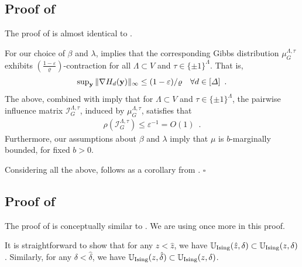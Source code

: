 \documentclass[11pt,reqno]{amsart}
\numberwithin{equation}{section}
\newcommand{\cI}{{\mathcal{I}}}
\newcommand{\cadmiumgreen}[1]{{\color{cadmiumgreen}#1}}
\newcommand{\goldenbrown}[1]{{\color{goldenbrown}#1}}
\newcommand{\maxDeg}{{\Delta}}
\newcommand{\UnIsing}{{\mathbb{U}_{\rm Ising}}}
\newcommand{\logtrecur}{H}
\newcommand{\infmatrix}{\cI}
\newcommand{\spradius}{{\rho}}
\newcommand{\norm}[2]{\goldenbrown{\|} #1 \goldenbrown{\|}_{#2}}
\newcommand{\aspradius}{{\varrho}}
\renewcommand{\cadmiumgreen}[1]{#1}
\renewcommand{\goldenbrown}[1]{#1}
\newcommand{\kz}{\cadmiumgreen{z}}
\renewcommand{\kz}{z}
\begin{document}
\subsection{Proof of }\label{sec:thrm:Ising4SPRadiusAdj}
The proof of  is almost identical to  .

For our choice of $\beta$ and $\lambda$,   implies 
% 
that the corresponding Gibbs distribution  $\mu^{\Lambda,\tau}_G$ exhibits $\left( \frac{1-\varepsilon}{\aspradius}\right)$-contraction
for all $\Lambda\subset V$ and $\tau\in \{\pm 1\}^{\Lambda}$. That is, 
\begin{align}\nonumber
\sup\nolimits_{\bf y}\norm{\nabla \logtrecur_d ({\bf y})}{\infty} &\leq (1-\varepsilon)/\aspradius & \forall d\in [\maxDeg] \enspace.
\end{align}
The above, combined with  imply that 
for $\Lambda\subset V$ and $\tau\in \{\pm 1\}^{\Lambda}$, the pairwise influence 
matrix $\infmatrix^{\Lambda,\tau}_{G}$, induced by $\mu^{\Lambda,\tau}_G$, satisfies that 
%
\begin{align}\nonumber %
\spradius(\infmatrix^{\Lambda,\tau}_{G})\leq \varepsilon^{-1}=O(1) \enspace.
\end{align}
%
Furthermore, our assumptions about $\beta$ and $\lambda$ imply that $\mu$ is $b$-marginally bounded, 
for fixed $b>0$. 

Considering all the above,  follows as a corollary from .
%
\hfill $\square$



 
\subsection{Proof of }
The proof of  is conceptually similar to .
We are using  once more in this proof. 


It is straightforward to show that for any $\kz<\hat{\kz}$, we have $\UnIsing(\hat{\kz},\delta)\subset \UnIsing(\kz,\delta)$. 
%
Similarly,  for any $\delta<\hat{\delta}$, we have $\UnIsing(\kz,\hat{\delta})\subset \UnIsing(\kz,\delta)$. 
\end{document}
